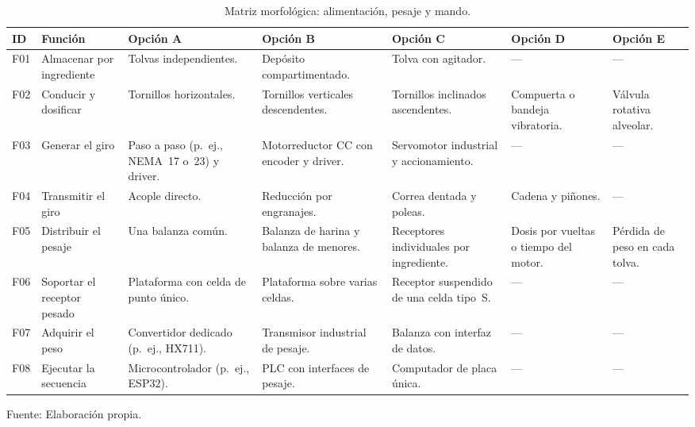 \providecommand{\descartada}[1]{\textcolor{gray}{#1~\textdagger}}
\providecommand{\reserva}[1]{\textcolor{gray}{#1~\textdaggerdbl}}
\providecommand{\sel}[1]{{\setlength{\fboxsep}{1.5pt}\fbox{\parbox[t]{\dimexpr\linewidth-2\fboxsep-2\fboxrule\relax}{\raggedright\textbf{#1}}}}}

\begin{table}[H]
    \centering
    \caption{Matriz morfológica: alimentación, pesaje y mando.}
    \label{tab:morfologia_dosificadora}
    \footnotesize
    \setlength{\tabcolsep}{2.5pt}
    \renewcommand{\arraystretch}{1.15}
    \begin{tabularx}{\textwidth}{p{}>{\raggedright\arraybackslash}p{}*{5}{>{\raggedright\arraybackslash}X}}
        \toprule
        \textbf{ID} & \textbf{Función} & \textbf{Opción A} & \textbf{Opción B} & \textbf{Opción C} & \textbf{Opción D} & \textbf{Opción E} \\
        \midrule
        F01 & Almacenar por ingrediente & Tolvas independientes. & Depósito compartimentado. & Tolva con agitador. & --- & --- \\
        \addlinespace[2pt]
        F02 & Conducir y dosificar & Tornillos horizontales. & Tornillos verticales descendentes. & Tornillos inclinados ascendentes. & Compuerta o bandeja vibratoria. & Válvula rotativa alveolar. \\
        \addlinespace[2pt]
        F03 & Generar el giro & Paso a paso (p.~ej., NEMA~17 o~23) y driver. & Motorreductor CC con encoder y driver. & Servomotor industrial y accionamiento. & --- & --- \\
        \addlinespace[2pt]
        F04 & Transmitir el giro & Acople directo. & Reducción por engranajes. & Correa dentada y poleas. & Cadena y piñones. & --- \\
        \addlinespace[2pt]
        F05 & Distribuir el pesaje & Una balanza común. & Balanza de harina y balanza de menores. & Receptores individuales por ingrediente. & Dosis por vueltas o tiempo del motor. & Pérdida de peso en cada tolva. \\
        \addlinespace[2pt]
        F06 & Soportar el receptor pesado & Plataforma con celda de punto único. & Plataforma sobre varias celdas. & Receptor suspendido de una celda tipo~S. & --- & --- \\
        \addlinespace[2pt]
        F07 & Adquirir el peso & Convertidor dedicado (p.~ej., HX711). & Transmisor industrial de pesaje. & Balanza con interfaz de datos. & --- & --- \\
        \addlinespace[2pt]
        F08 & Ejecutar la secuencia & Microcontrolador (p.~ej., ESP32). & PLC con interfaces de pesaje. & Computador de placa única. & --- & --- \\
        \bottomrule
    \end{tabularx}
    \par\smallskip
    Fuente: Elaboración propia.
\end{table}

